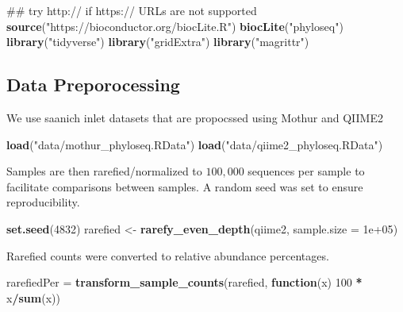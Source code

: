 \documentclass[11 pt,]{article}
\newenvironment{Shaded}{\begin{snugshade}}{\end{snugshade}}
\newcommand{\KeywordTok}[1]{\textcolor[rgb]{0.13,0.29,0.53}{\textbf{#1}}}
\newcommand{\DataTypeTok}[1]{\textcolor[rgb]{0.13,0.29,0.53}{#1}}
\newcommand{\DecValTok}[1]{\textcolor[rgb]{0.00,0.00,0.81}{#1}}
\newcommand{\FloatTok}[1]{\textcolor[rgb]{0.00,0.00,0.81}{#1}}
\newcommand{\StringTok}[1]{\textcolor[rgb]{0.31,0.60,0.02}{#1}}
\newcommand{\ControlFlowTok}[1]{\textcolor[rgb]{0.13,0.29,0.53}{\textbf{#1}}}
\newcommand{\OperatorTok}[1]{\textcolor[rgb]{0.81,0.36,0.00}{\textbf{#1}}}
\newcommand{\NormalTok}[1]{#1}
\begin{document}
\begin{Shaded}
\begin{Highlighting}[]
\NormalTok{## try http:// if https:// URLs are not supported}
\KeywordTok{source}\NormalTok{(}\StringTok{"https://bioconductor.org/biocLite.R"}\NormalTok{)}
\KeywordTok{biocLite}\NormalTok{(}\StringTok{"phyloseq"}\NormalTok{)}
\KeywordTok{library}\NormalTok{(}\StringTok{"tidyverse"}\NormalTok{)}
\KeywordTok{library}\NormalTok{(}\StringTok{"gridExtra"}\NormalTok{)}
\KeywordTok{library}\NormalTok{(}\StringTok{"magrittr"}\NormalTok{)}
\end{Highlighting}
\end{Shaded}

\subsection{Data Preporocessing}\label{data-preporocessing}

We use saanich inlet datasets that are propocssed using Mothur and
QIIME2

\begin{Shaded}
\begin{Highlighting}[]
\KeywordTok{load}\NormalTok{(}\StringTok{"data/mothur_phyloseq.RData"}\NormalTok{)}
\KeywordTok{load}\NormalTok{(}\StringTok{"data/qiime2_phyloseq.RData"}\NormalTok{)}
\end{Highlighting}
\end{Shaded}

Samples are then rarefied/normalized to \(100,000\) sequences per sample
to facilitate comparisons between samples. A random seed was set to
ensure reproducibility.

\begin{Shaded}
\begin{Highlighting}[]
\KeywordTok{set.seed}\NormalTok{(}\DecValTok{4832}\NormalTok{)}
\NormalTok{rarefied <-}\StringTok{ }\KeywordTok{rarefy_even_depth}\NormalTok{(qiime2, }\DataTypeTok{sample.size =} \FloatTok{1e+05}\NormalTok{)}
\end{Highlighting}
\end{Shaded}

Rarefied counts were converted to relative abundance percentages.

\begin{Shaded}
\begin{Highlighting}[]
\NormalTok{rarefiedPer =}\StringTok{ }\KeywordTok{transform_sample_counts}\NormalTok{(rarefied, }\ControlFlowTok{function}\NormalTok{(x) }\DecValTok{100} \OperatorTok{*}\StringTok{ }\NormalTok{x}\OperatorTok{/}\KeywordTok{sum}\NormalTok{(x))}
\end{Highlighting}
\end{Shaded}
\end{document}
